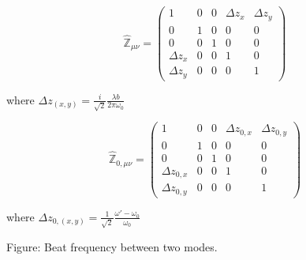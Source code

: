 		\begin{equation} \label{waistloc_matrix}
		\hat{\mathbb{Z}}_{\mu \nu} = 
		\begin{pmatrix}
		1				&0		&0		&\Delta z_x 	&\Delta z_y  
		\\ 0			&1		&0		&0 				&0
		\\ 0			&0		&1		&0 				&0
		\\ \Delta z_x	&0		&0		&1 				&0
		\\ \Delta z_y	&0		&0		&0				&1 
		\end{pmatrix}
		\end{equation}
		
		where $\Delta z_{(x,y)} =  \frac{i}{\sqrt{2}} \frac{\lambda b}{2\pi\omega_{0}} $
		
		\begin{equation} \label{waistsize_matrix}
		\hat{\mathbb{Z}}_{0, \mu \nu} = 
		\begin{pmatrix}
		1					&0		&0		&\Delta z_{0,x} 	&\Delta z_{0,y} 
		\\ 0				&1		&0		&0 					&0
		\\ 0				&0		&1		&0 					&0
		\\ \Delta z_{0,x} 	&0		&0		&1 					&0
		\\ \Delta z_{0,y} 	&0		&0		&0					&1 
		\end{pmatrix}
		\end{equation}

		where $\Delta z_{0,(x,y)} =   \frac{1}{\sqrt{2}} \frac{\omega'-\omega_{0}}{\omega_{0}} $

		Figure: Beat frequency between two modes.
	
	